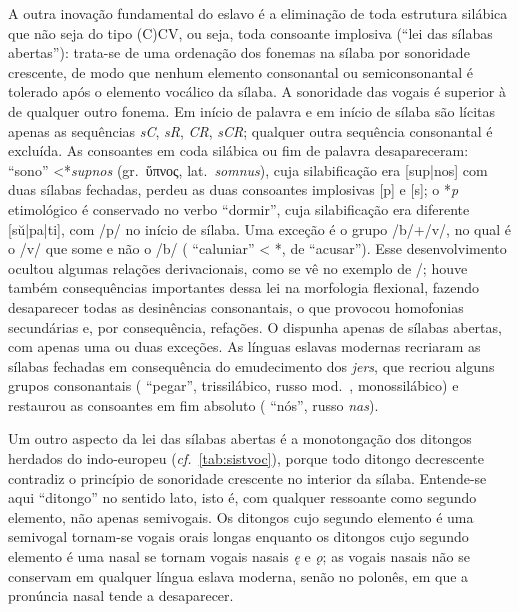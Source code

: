 A outra inovação fundamental do eslavo é a eliminação de toda estrutura
silábica que não seja do tipo {(C)}CV, ou seja, toda consoante implosiva
(``lei das sílabas abertas''): trata-se de uma ordenação dos fonemas na
sílaba por sonoridade crescente, de modo que nenhum elemento consonantal
ou semiconsonantal é tolerado após o elemento vocálico da sílaba. A
sonoridade das vogais é superior à de qualquer outro fonema. Em início
de palavra e em início de sílaba são lícitas apenas as sequências
\emph{sC}, \emph{sR}, \emph{CR}, \emph{sCR}; qualquer outra sequência
consonantal é excluída. As consoantes em coda silábica ou fim de palavra
desapareceram:   ``sono''
<*\emph{supnos} (gr.~ὕπνος, lat.~\emph{somnus}), cuja
silabificação era [sup|nos] com duas sílabas fechadas,
perdeu as duas consoantes implosivas [p] e [s]; o *\emph{p}
etimológico é conservado no verbo  ``dormir'',
cuja silabificação era diferente [sŭ|pa|ti], com /p/
no início de sílaba. Uma exceção é o grupo /b/+/v/, no qual é o /v/ que
some e não o /b/ ( ``caluniar'' <
*, de  ``acusar''). Esse
desenvolvimento ocultou algumas relações derivacionais, como se vê no
exemplo de \slash{}; houve também consequências
importantes dessa lei na morfologia flexional, fazendo desaparecer todas
as desinências consonantais, o que provocou homofonias secundárias e,
por consequência, refações. O  dispunha apenas de sílabas abertas,
com apenas uma ou duas exceções. As línguas eslavas modernas recriaram
as sílabas fechadas em consequência do emudecimento dos \emph{jers}, que recriou
alguns grupos consonantais ( 
 ``pegar'', trissilábico, russo mod.\
, monossilábico) e restaurou as consoantes em fim
absoluto (\glsxtrlong{eslavoantigo} \gloss{acu.} \cirilocsex{насъ,nasъ} ``nós'', russo
\emph{nas}).

Um outro aspecto da lei das sílabas abertas é a monotongação dos
ditongos herdados do indo-europeu (\emph{cf.}~\autoref{tab:sistvoc}), porque
todo ditongo
decrescente contradiz o princípio de sonoridade crescente no interior da
sílaba. Entende-se aqui ``ditongo'' no sentido lato, isto é, com
qualquer ressoante como segundo elemento, não apenas semivogais. Os
ditongos cujo segundo elemento é uma semivogal tornam-se vogais orais
longas enquanto os ditongos cujo segundo elemento é uma nasal se tornam
vogais nasais \emph{ę} e \emph{ǫ}; as vogais nasais não se conservam em
qualquer língua eslava moderna, senão no polonês, em que a pronúncia
nasal tende a desaparecer.

